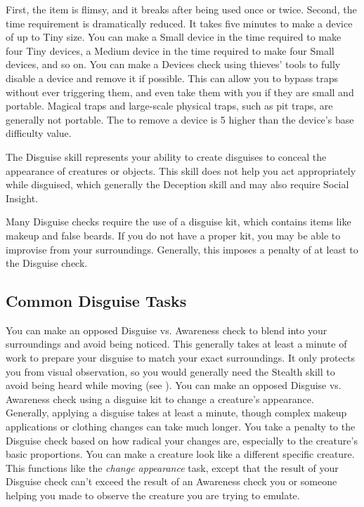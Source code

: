         First, the item is flimsy, and it breaks after being used once or twice.
        Second, the time requirement is dramatically reduced.
        It takes five minutes to make a device of up to Tiny size.
        You can make a Small device in the time required to make four Tiny devices, a Medium device in the time required to make four Small devices, and so on.
         You can make a Devices check using thieves' tools to fully disable a device and remove it if possible.
        This can allow you to bypass traps without ever triggering them, and even take them with you if they are small and portable.
        Magical traps and large-scale physical traps, such as pit traps, are generally not portable.
        The  to remove a device is 5 higher than the device's base difficulty value.

\newpage
{}
    The Disguise skill represents your ability to create disguises to conceal the appearance of creatures or objects.
    This skill does not help you act appropriately while disguised, which generally the Deception skill and may also require Social Insight.

    Many Disguise checks require the use of a disguise kit, which contains items like makeup and false beards.
    If you do not have a proper kit, you may be able to improvise from your surroundings.
    Generally, this imposes a penalty of at least  to the Disguise check.

    \subsection{Common Disguise Tasks}
         You can make an opposed Disguise vs. Awareness check to blend into your surroundings and avoid being noticed.
        This generally takes at least a minute of work to prepare your disguise to match your exact surroundings.
        It only protects you from visual observation, so you would generally need the Stealth skill to avoid being heard while moving (see ).
        You can make an opposed Disguise vs. Awareness check using a disguise kit to change a creature's appearance.
        Generally, applying a disguise takes at least a minute, though complex makeup applications or clothing changes can take much longer.
        You take a penalty to the Disguise check based on how radical your changes are, especially to the creature's basic proportions.
         You can make a creature look like a different specific creature.
         This functions like the \textit{change appearance} task, except that the result of your Disguise check can't exceed the result of an Awareness check you or someone helping you made to observe the creature you are trying to emulate.

